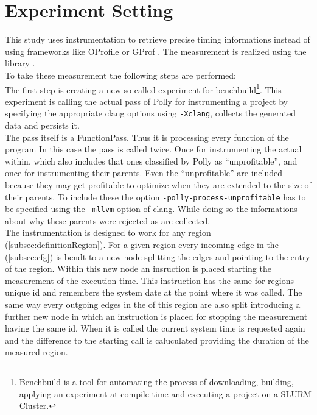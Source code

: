 \section{Experiment Setting}\label{sec:experimentSettings}
This study uses instrumentation to retrieve precise timing informations instead of using frameworks like OProfile \cite{oprofile} or GProf \cite{gprof}.
The measurement is realized using the \papi library \cite{papi}.\\
To take these measurement the following steps are performed:\\
The first step is creating a new so called experiment for benchbuild\footnote{Benchbuild is a tool for automating the process of downloading, building, applying an experiment at compile time and executing a project on a SLURM Cluster.}.
This experiment is calling the actual pass of Polly for instrumenting a project by specifying the appropriate clang options using \texttt{-Xclang}, collects the generated data and persists it.\\
The pass itself is a FunctionPass.
Thus it is processing every function of the program
In this case the pass is called twice.
Once for instrumenting the actual \scops within, which also includes that ones classified by Polly as \enquote{unprofitable}, and once for instrumenting their parents.
Even the \enquote{unprofitable} \scops are included because they may get profitable to optimize when they are extended to the size of their parents.
To include these \scops the option \texttt{-polly-process-unprofitable} has to be specified using the \texttt{-mllvm} option of clang.
While doing so the informations about why these parents were rejected as \scops are collected.\\
The instrumentation is designed to work for any region (\autoref{subsec:definitionRegion}).
For a given region every incoming edge in the \cfg (\autoref{subsec:cfg}) is bendt to a new node splitting the edges and pointing to the entry of the region.
Within this new node an insruction is placed starting the measurement of the execution time.
This instruction has the same for regions unique id and remembers the system date at the point where it was called.
The same way every outgoing edges in the \cfg of this region are also split introducing a further new node in which an instruction is placed for stopping the measurement having the same id.
When it is called the current system time is requested again and the difference to the starting call is caluculated providing the duration of the measured region.\\
